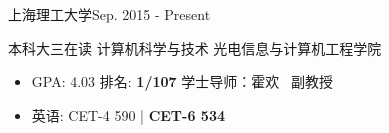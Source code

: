 \documentclass{sorahjy_cv}
\begin{document}
\pagestyle{empty}


\begin{cvHeader}
\end{cvHeader}


%
%



%
%

\begin{sectionContentSimple}{上海理工大学}{Sep. 2015 - Present}
	\item 本科大三在读 \quad 计算机科学与技术 \quad 光电信息与计算机工程学院
	\begin{itemize}
		\item GPA: 4.03 \quad 排名: \textbf{1/107} \quad 学士导师：霍欢 \ 副教授
		\item 英语: CET-4 590 | \textbf{CET-6 534}
	\end{itemize}
\end{sectionContentSimple}

%
%




\end{document}
